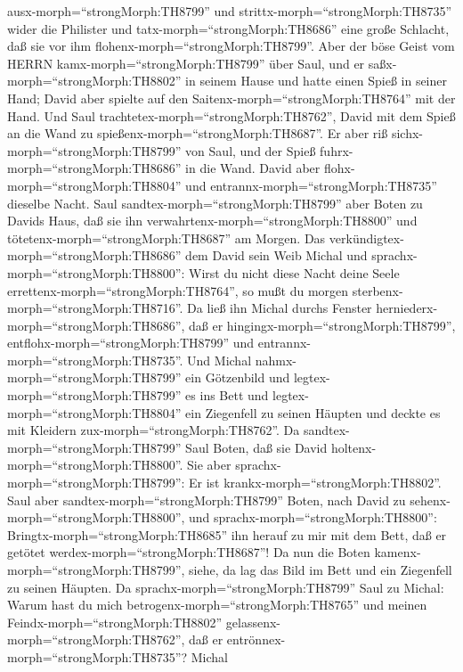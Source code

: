 ausx-morph=``strongMorph:TH8799'' und
strittx-morph=``strongMorph:TH8735'' wider die Philister und
tatx-morph=``strongMorph:TH8686'' eine große Schlacht, daß sie vor ihm
flohenx-morph=``strongMorph:TH8799''.  Aber der böse Geist
vom HERRN kamx-morph=``strongMorph:TH8799'' über Saul, und er
saßx-morph=``strongMorph:TH8802'' in seinem Hause und hatte einen Spieß
in seiner Hand; David aber spielte auf den
Saitenx-morph=``strongMorph:TH8764'' mit der Hand.  Und
Saul trachtetex-morph=``strongMorph:TH8762'', David mit dem Spieß an die
Wand zu spießenx-morph=``strongMorph:TH8687''. Er aber riß
sichx-morph=``strongMorph:TH8799'' von Saul, und der Spieß
fuhrx-morph=``strongMorph:TH8686'' in die Wand. David aber
flohx-morph=``strongMorph:TH8804'' und
entrannx-morph=``strongMorph:TH8735'' dieselbe Nacht.  Saul
sandtex-morph=``strongMorph:TH8799'' aber Boten zu Davids Haus, daß sie
ihn verwahrtenx-morph=``strongMorph:TH8800'' und
tötetenx-morph=``strongMorph:TH8687'' am Morgen. Das
verkündigtex-morph=``strongMorph:TH8686'' dem David sein Weib Michal und
sprachx-morph=``strongMorph:TH8800'': Wirst du nicht diese Nacht deine
Seele errettenx-morph=``strongMorph:TH8764'', so mußt du morgen
sterbenx-morph=``strongMorph:TH8716''.  Da ließ ihn Michal
durchs Fenster herniederx-morph=``strongMorph:TH8686'', daß er
hingingx-morph=``strongMorph:TH8799'',
entflohx-morph=``strongMorph:TH8799'' und
entrannx-morph=``strongMorph:TH8735''.  Und Michal
nahmx-morph=``strongMorph:TH8799'' ein Götzenbild und
legtex-morph=``strongMorph:TH8799'' es ins Bett und
legtex-morph=``strongMorph:TH8804'' ein Ziegenfell zu seinen Häupten und
deckte es mit Kleidern zux-morph=``strongMorph:TH8762''. 
Da sandtex-morph=``strongMorph:TH8799'' Saul Boten, daß sie David
holtenx-morph=``strongMorph:TH8800''. Sie aber
sprachx-morph=``strongMorph:TH8799'': Er ist
krankx-morph=``strongMorph:TH8802''.  Saul aber
sandtex-morph=``strongMorph:TH8799'' Boten, nach David zu
sehenx-morph=``strongMorph:TH8800'', und
sprachx-morph=``strongMorph:TH8800'':
Bringtx-morph=``strongMorph:TH8685'' ihn herauf zu mir mit dem Bett, daß
er getötet werdex-morph=``strongMorph:TH8687''!  Da nun die
Boten kamenx-morph=``strongMorph:TH8799'', siehe, da lag das Bild im
Bett und ein Ziegenfell zu seinen Häupten.  Da
sprachx-morph=``strongMorph:TH8799'' Saul zu Michal: Warum hast du mich
betrogenx-morph=``strongMorph:TH8765'' und meinen
Feindx-morph=``strongMorph:TH8802''
gelassenx-morph=``strongMorph:TH8762'', daß er
entrönnex-morph=``strongMorph:TH8735''? Michal
